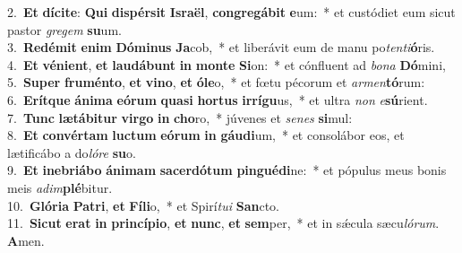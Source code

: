 {2.~}\textbf{Et} \textbf{dí}\textbf{ci}\textbf{te}: \textbf{Qui} \textbf{di}\textbf{spér}\textbf{sit} \textbf{Is}\textbf{ra}\textbf{ël}, \textbf{con}\textbf{gre}\textbf{gá}\textbf{bit} \textbf{e}um:~* et custódiet eum sicut pastor \textit{gre}\textit{gem} \textbf{su}um.\\
{3.~}\textbf{Re}\textbf{dé}\textbf{mit} \textbf{e}\textbf{nim} \textbf{Dó}\textbf{mi}\textbf{nus} \textbf{Ja}cob,~* et liberávit eum de manu po\textit{ten}\textit{ti}\textbf{ó}ris.\\
{4.~}\textbf{Et} \textbf{vé}\textbf{ni}\textbf{ent}, \textbf{et} \textbf{lau}\textbf{dá}\textbf{bunt} \textbf{in} \textbf{mon}\textbf{te} \textbf{Si}on:~* et cónfluent ad \textit{bo}\textit{na} \textbf{Dó}mini,\\
{5.~}\textbf{Su}\textbf{per} \textbf{fru}\textbf{mén}\textbf{to}, \textbf{et} \textbf{vi}\textbf{no}, \textbf{et} \textbf{ó}\textbf{le}o,~* et fœtu pécorum et \textit{ar}\textit{men}\textbf{tó}rum:\\
{6.~}\textbf{E}\textbf{rít}\textbf{que} \textbf{á}\textbf{ni}\textbf{ma} \textbf{e}\textbf{ó}\textbf{rum} \textbf{qua}\textbf{si} \textbf{hor}\textbf{tus} \textbf{ir}\textbf{rí}\textbf{gu}us,~* et ultra \textit{non} \textit{e}\textbf{sú}rient.\\
{7.~}\textbf{Tunc} \textbf{læ}\textbf{tá}\textbf{bi}\textbf{tur} \textbf{vir}\textbf{go} \textbf{in} \textbf{cho}ro,~* júvenes et \textit{se}\textit{nes} \textbf{si}mul:\\
{8.~}\textbf{Et} \textbf{con}\textbf{vér}\textbf{tam} \textbf{lu}\textbf{ctum} \textbf{e}\textbf{ó}\textbf{rum} \textbf{in} \textbf{gáu}\textbf{di}um,~* et consolábor eos, et lætificábo a do\textit{ló}\textit{re} \textbf{su}o.\\
{9.~}\textbf{Et} \textbf{i}\textbf{ne}\textbf{bri}\textbf{á}\textbf{bo} \textbf{á}\textbf{ni}\textbf{mam} \textbf{sa}\textbf{cer}\textbf{dó}\textbf{tum} \textbf{pin}\textbf{gué}\textbf{di}ne:~* et pópulus meus bonis meis \textit{a}\textit{dim}\textbf{plé}bitur.\\
{10.~}\textbf{Gló}\textbf{ri}\textbf{a} \textbf{Pa}\textbf{tri}, \textbf{et} \textbf{Fí}\textbf{li}o,~* et Spirí\textit{tu}\textit{i} \textbf{San}cto.\\
{11.~}\textbf{Si}\textbf{cut} \textbf{e}\textbf{rat} \textbf{in} \textbf{prin}\textbf{cí}\textbf{pi}\textbf{o}, \textbf{et} \textbf{nunc}, \textbf{et} \textbf{sem}per,~* et in sǽcula sæcu\textit{ló}\textit{rum}. \textbf{A}men.\\
